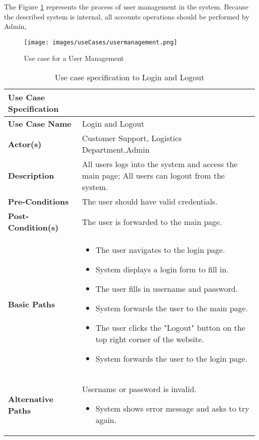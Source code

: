 \documentclass[a4paper]{article}
\begin{document}
    The Figure \ref{UseCaseUserManagement} represents the process of user management in the system. Because the described system is internal, all accounts operations should be performed by Admin,
    \begin{figure}[H]
     \centering
     \texttt{[image: images/useCases/usermanagement.png]}
     \caption{Use case for a User Management}
     \label{UseCaseUserManagement}
    \end{figure}
  
      \begin{longtable}{|p{}|p{}|}
        \caption{Use case specification to Login and Logout}
        \label{LoginAndLogoutUseCase} \\
        \hline
        Use Case Specification  &  \\
         \hline
         \endhead
         \textbf{Use Case Name} & Login and Logout\\
         \hline
         \textbf{Actor(s)} & Customer Support, Logistics Department,Admin \\
         \hline
         \textbf{Description} & All users logs into the system and access the main page; All users can logout from the system. \\
         \hline
         \textbf{Pre-Conditions} & The user should have valid credentials. \\
         \hline
        \textbf{Post-Condition(s)} &  The user is forwarded to the main page.\\
         \hline
         \textbf{Basic Paths} & 
         \begin{itemize}
             \item The user navigates to the login page.
             \item System displays a login form to fill in.
             \item The user fills in username and password.
             \item System forwards the user to the main page.
             \item The user clicks the "Logout" button on the top right corner of the website.
             \item System forwards the user to the login page.
         \end{itemize} 
       \\
        
      \hline
    \textbf{Alternative Paths} & Username or password is invalid.
        \begin{itemize}
            \item System shows error message and asks to try again.
        \end{itemize} \\
        \hline
    \end{longtable}
\end{document}
